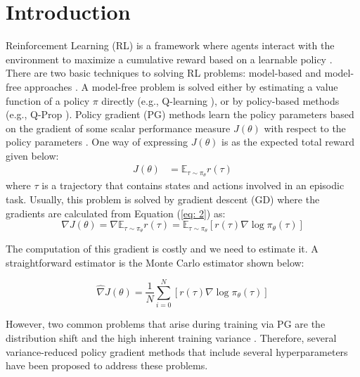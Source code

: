 \documentclass[10pt,twocolumn,letterpaper]{article}
\begin{document}
\section{Introduction}
Reinforcement Learning (RL) is a framework where
agents interact with the environment to maximize a cumulative reward based on a learnable policy \cite{RN6}. There are two basic techniques to solving RL problems: model-based and model-free approaches \cite{lecun}. A model-free problem is solved either by estimating a value function of a policy $\pi$ directly (e.g., Q-learning \cite{qlearning}), or by policy-based methods (e.g., Q-Prop \cite{williams}). 
Policy gradient (PG) methods learn the policy parameters based on the gradient of some scalar performance measure $J(\theta)$ with respect to the policy parameters \cite{sutton2018reinforcement}. One way of expressing $J(\theta)$ is as the expected total reward given below: 
\begin{equation} \label{eq: 1}
\begin{aligned}
J(\theta)
&=\mathbb{E}_{\tau \sim \pi_{\theta}} r(\tau)
\end{aligned}
\end{equation}
where $ \tau $ is a trajectory that contains states and actions involved in an episodic task.
Usually, this problem is solved by gradient descent (GD) where the gradients are calculated from Equation (\ref{eq: 2}) as:
\begin{equation} \label{eq: 2}
\nabla J(\theta)=\nabla \mathbb{E}_{\tau \sim \pi_{\theta}} r(\tau)=\mathbb{E}_{\tau \sim \pi_{\theta}}\left[r(\tau) \nabla \log \pi_{\theta}(\tau)\right]
\end{equation}

The computation of this gradient is costly and we need to estimate it. A straightforward  estimator is the Monte Carlo estimator shown below:

\begin{equation} \label{eq: 3}
\hat{\nabla} J(\theta)=\frac{1}{N} \sum_{i=0}^{N}\left[r(\tau) \nabla \log \pi_{\theta}(\tau)\right]
\end{equation}

However, two common problems that arise during training via PG are the distribution shift and the high inherent training variance  \cite{RN12}. Therefore, several variance-reduced policy gradient methods that include several hyperparameters have been proposed to address these problems. 
\end{document}

